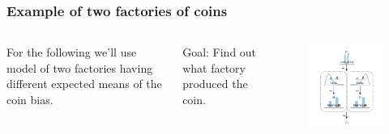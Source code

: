 \documentclass[usenames,dvipsnames,table]{beamer}
\begin{document}
\begin{frame}
\frametitle{Example of two factories of coins}
\begin{columns}[c]
For the following we'll use model of two factories having different expected means of the coin bias.

\vspace{1em}
Goal: Find out what factory produced the coin.
\begin{figure}
\centering
\vspace{-1em}
\includegraphics[width=\textwidth]{img/fig10_2}
\end{figure}
\end{columns}
\end{frame}
\end{document}
